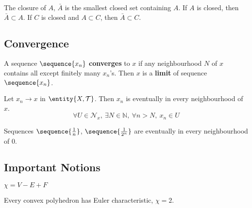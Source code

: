 \begin{note}
	The closure of $A$, $\bar{A}$ is the smallest closed set containing $A$.
	If $A$ is closed, then $\bar{A} \subset A$.
	If $C$ is closed and $A \subset C$, then $\bar{A} \subset C$.
\end{note}

\subsection{Convergence}
\begin{definition}[neighbourhood]
	A sequence $\sequence{x_n}$ \textbf{converges} to $x$ if any neighbourhood $N$ of $x$ contains all except finitely many $x_n$'s.
	Then $x$ is a \textbf{limit} of sequence $\sequence{x_n}$.
\end{definition}
\begin{note}
	Let $x_n \to x$ in $\entity{X,\mathcal{T}}$.
	Then $x_n$ is eventually in every neighbourhood of $x$.
	\begin{equation}
		\forall U \in \mathcal{N}_x,\ \exists N \in \mathbb{N},\ \forall n > N,\ x_n \in U
	\end{equation}
\end{note}

\begin{note}
	Sequences $\sequence{\frac{1}{n}}$, $\sequence{\frac{1}{2^n}}$ are eventually in every neighbourhood of $0$.
\end{note}


\subsection*{Important Notions}
\begin{definition}
	$\chi = V - E + F$
\end{definition}
\begin{remark}
	Every convex polyhedron has Euler characteristic, $\chi = 2$.
\end{remark}
